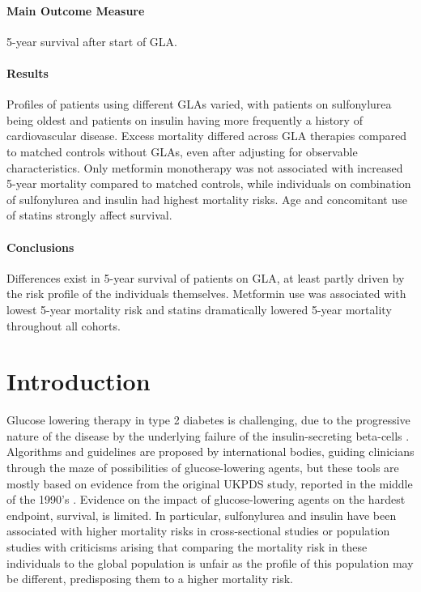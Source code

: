 {\paragraph{Main Outcome Measure} 5-year survival after start of GLA. 

\paragraph{Results} Profiles of patients using different GLAs varied, with patients on sulfonylurea being oldest and patients on insulin having more frequently a history of cardiovascular disease. Excess mortality differed across GLA therapies compared to matched controls without GLAs, even after adjusting for observable characteristics. Only metformin monotherapy was not associated with increased 5-year mortality compared to matched controls, while individuals on combination of sulfonylurea and insulin had highest mortality risks. Age and concomitant use of statins strongly affect survival. 

\paragraph{Conclusions} Differences exist in 5-year survival of patients on GLA, at least partly driven by the risk profile of the individuals themselves. Metformin use was associated with lowest 5-year mortality risk and statins dramatically lowered 5-year mortality throughout all cohorts.
}



\cleardoublepage

\section{Introduction}
Glucose lowering therapy in type 2 diabetes is challenging, due to the progressive nature of the disease by the underlying failure of the insulin-secreting beta-cells \citep{s1}. Algorithms and guidelines are proposed by international bodies, guiding clinicians through the maze of possibilities of glucose-lowering agents, but these tools are mostly based on evidence from the original UKPDS study, reported in the middle of the 1990's \citep{s2}. Evidence on the impact of glucose-lowering agents on the hardest endpoint, survival, is limited. In particular, sulfonylurea and insulin have been associated with higher mortality risks in cross-sectional studies or population studies \citep{s3,s4,s5,s6,s7,s8} with criticisms arising that comparing the mortality risk in these individuals to the global population is unfair as the profile of this population may be different, predisposing them to a higher mortality risk. 

